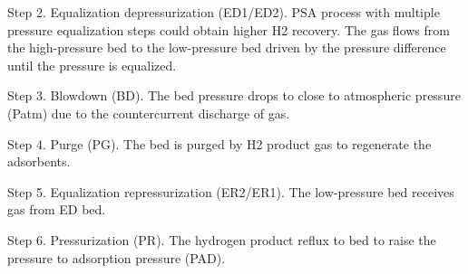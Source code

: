 \documentclass[preprint,12pt]{elsarticle}
\begin{document}
Step 2. Equalization depressurization (ED1/ED2). PSA process with multiple pressure equalization steps could obtain higher H2 recovery. The gas flows from the high-pressure bed to the low-pressure bed driven by the pressure difference until the pressure is equalized.

Step 3. Blowdown (BD). The bed pressure drops to close to atmospheric pressure (Patm) due to the countercurrent discharge of gas.

Step 4. Purge (PG). The bed is purged by H2 product gas to regenerate the adsorbents.

Step 5. Equalization repressurization (ER2/ER1). The low-pressure bed receives gas from ED bed.

Step 6. Pressurization (PR). The hydrogen product reflux to bed to raise the pressure to adsorption pressure (PAD).
\end{document}
